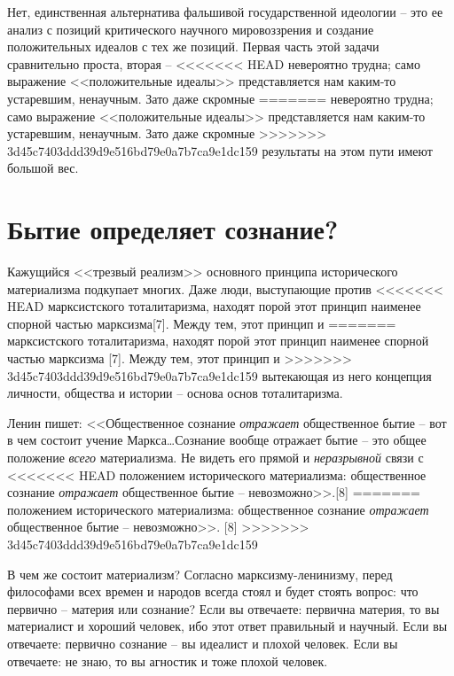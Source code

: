 \documentclass{book}
\begin{document}
Нет, единственная альтернатива фальшивой государственной идеологии -- это ее анализ с позиций критического научного 
мировоззрения и создание положительных идеалов с тех же позиций. Первая часть этой задачи сравнительно проста, вто­рая -- 
<<<<<<< HEAD
невероятно трудна; само выражение <<положительные идеалы>> представляется нам каким‑то устаревшим, ненауч­ным. Зато даже скромные 
=======
невероятно трудна; само выражение <<положительные идеалы>> представляется нам каким-то устаревшим, ненауч­ным. Зато даже скромные 
>>>>>>> 3d45c7403ddd39d9e516bd79e0a7b7ca9e1dc159
результаты на этом пути имеют большой вес.



\section{Бытие определяет сознание?}

Кажущийся <<трезвый реализм>> основного принципа исто­рического материализма подкупает многих. Даже люди, высту­пающие против 
<<<<<<< HEAD
марксистского тоталитаризма, находят порой этот принцип наименее спорной частью марксизма[7]. Между тем, этот принцип и 
=======
марксистского тоталитаризма, находят порой этот принцип наименее спорной частью марксизма [7]. Между тем, этот принцип и 
>>>>>>> 3d45c7403ddd39d9e516bd79e0a7b7ca9e1dc159
вытекающая из него концепция личности, общества и истории -- основа основ тоталитаризма.

Ленин пишет: <<Общественное сознание \textit{отражает}  общест­венное бытие -- вот в чем состоит учение Маркса\ldots Сознание 
вообще отражает бытие -- это общее положение \textit{всего}  матери­ализма. Не видеть его прямой и \textit{неразрывной}  связи с 
<<<<<<< HEAD
положе­нием исторического материализма: общественное сознание \textit{отражает}  общественное бытие -- невозможно>>.[8]
=======
положе­нием исторического материализма: общественное сознание \textit{отражает}  общественное бытие -- невозможно>>. [8]
>>>>>>> 3d45c7403ddd39d9e516bd79e0a7b7ca9e1dc159

В чем же состоит материализм? Согласно марксизму-лени­низму, перед философами всех времен и народов всегда стоял и будет стоять 
вопрос: что первично -- материя или сознание? Если вы отвечаете: первична материя, то вы материалист и хороший человек, ибо этот 
ответ правильный и научный. Если вы отвечаете: первично сознание -- вы идеалист и плохой чело­век. Если вы отвечаете: не знаю, то 
вы агностик и тоже плохой человек.
\end{document}
